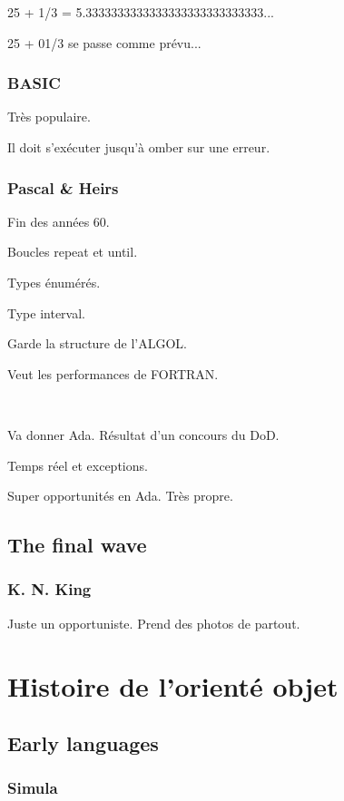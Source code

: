 \documentclass[a4paper,11pt]{article}
\begin{document}
25 + 1/3 = 5.3333333333333333333333333333...

25 + 01/3 se passe comme prévu...

\subsubsection{BASIC}

Très populaire.

Il doit s'exécuter jusqu'à omber sur une erreur.

\subsubsection{Pascal \& Heirs}

Fin des années 60.

Boucles repeat et until.

Types énumérés.

Type interval.

Garde la structure de l'ALGOL.

Veut les performances de FORTRAN.

\

Va donner Ada. Résultat d'un concours du DoD.

Temps réel et exceptions.

Super opportunités en Ada. Très propre.

\subsection{The final wave}

\subsubsection{K. N. King}

Juste un opportuniste. Prend des photos de partout.

\section{Histoire de l'orienté objet}

\subsection{Early languages}

\subsubsection{Simula}
\end{document}
